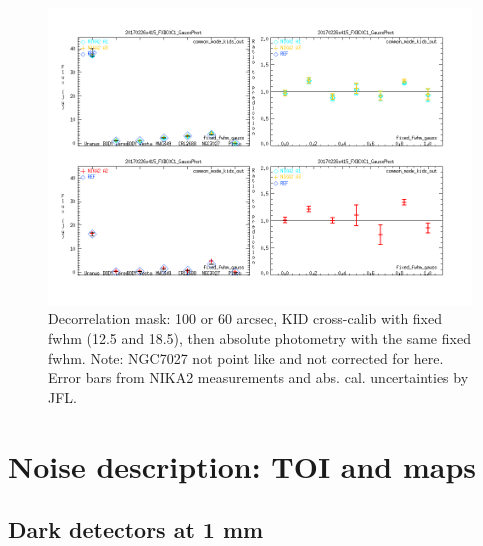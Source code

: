 \documentclass[a4paper, 11pt]{article} %
\begin{document}
\begin{figure}
\begin{center}
\includegraphics[clip, angle=0, scale = 0.4]{Figures/Calibrators_N2R9_20170226s415_FXDC0C1_GaussPhotFluxType_fixed_fwhm_gauss.png}
\caption{Decorrelation mask: 100 or 60 arcsec, KID cross-calib with fixed fwhm
  (12.5 and 18.5), then absolute photometry with the same fixed fwhm. Note:
  NGC7027 not point like and not corrected for here. Error bars from NIKA2
  measurements and abs. cal. uncertainties by JFL.}
\label{fig:fov}
\end{center}
\end{figure}







\section{Noise description: TOI and maps}
\label{se:noise}

\subsection{Dark detectors at 1 mm}
\end{document}
